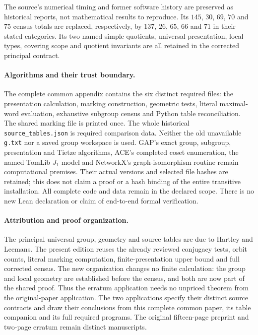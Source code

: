 The source's numerical timing and former software history are preserved as historical reports, not mathematical results to reproduce. Its $145$, $30$, $69$, $70$ and $75$ census totals are replaced, respectively, by $137$, $26$, $65$, $66$ and $71$ in their stated categories. Its two named simple quotients, universal presentation, local types, covering scope and quotient invariants are all retained in the corrected principal contract.


\paragraph{Algorithms and their trust boundary.}
The complete common appendix contains the six distinct required files: the presentation calculation, marking construction, geometric tests, literal maximal-word evaluation, exhaustive subgroup census and Python table reconciliation. The shared marking file is printed once. The whole historical \texttt{source\_tables.json} is required comparison data. Neither the old unavailable \texttt{g.txt} nor a saved group workspace is used. GAP's exact group, subgroup, presentation and Tietze algorithms, ACE's completed coset enumeration, the named TomLib $J_1$ model and NetworkX's graph-isomorphism routine remain computational premises. Their actual versions and selected file hashes are retained; this does not claim a proof or a hash binding of the entire transitive installation. All complete code and data remain in the declared scope. There is no new Lean declaration or claim of end-to-end formal verification.

\paragraph{Attribution and proof organization.}
The principal universal group, geometry and source tables are due to Hartley and Leemans. The present edition reuses the already reviewed conjugacy tests, orbit counts, literal marking computation, finite-presentation upper bound and full corrected census. The new organization changes no finite calculation: the group and local geometry are established before the census, and both are now part of the shared proof. Thus the erratum application needs no unpriced theorem from the original-paper application. The two applications specify their distinct source contracts and draw their conclusions from this complete common paper, its table companion and its full required programs. The original fifteen-page preprint and two-page erratum remain distinct manuscripts.
